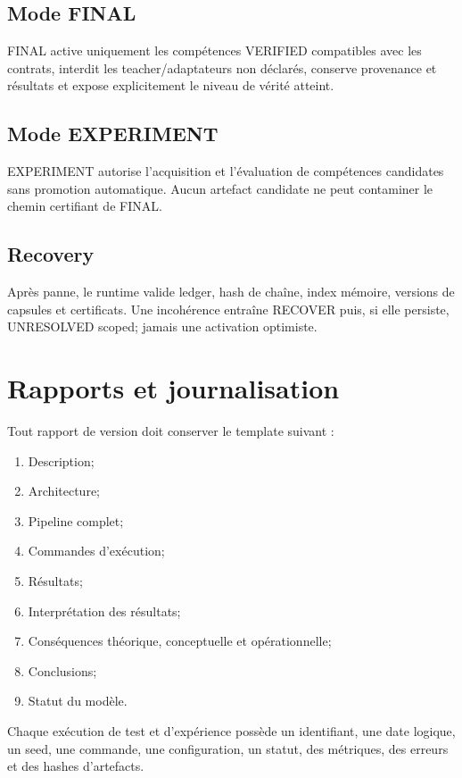 \documentclass[11pt,a4paper]{report}
\begin{document}
\section{Mode FINAL}
FINAL active uniquement les compétences VERIFIED compatibles avec les contrats, interdit les teacher/adaptateurs non déclarés, conserve provenance et résultats et expose explicitement le niveau de vérité atteint.

\section{Mode EXPERIMENT}
EXPERIMENT autorise l'acquisition et l'évaluation de compétences candidates sans promotion automatique. Aucun artefact candidate ne peut contaminer le chemin certifiant de FINAL.

\section{Recovery}
Après panne, le runtime valide ledger, hash de chaîne, index mémoire, versions de capsules et certificats. Une incohérence entraîne RECOVER puis, si elle persiste, UNRESOLVED scoped; jamais une activation optimiste.

\chapter{Rapports et journalisation}
Tout rapport de version doit conserver le template suivant :
\begin{enumerate}
\item Description;
\item Architecture;
\item Pipeline complet;
\item Commandes d'exécution;
\item Résultats;
\item Interprétation des résultats;
\item Conséquences théorique, conceptuelle et opérationnelle;
\item Conclusions;
\item Statut du modèle.
\end{enumerate}
Chaque exécution de test et d'expérience possède un identifiant, une date logique, un seed, une commande, une configuration, un statut, des métriques, des erreurs et des hashes d'artefacts.
\end{document}
